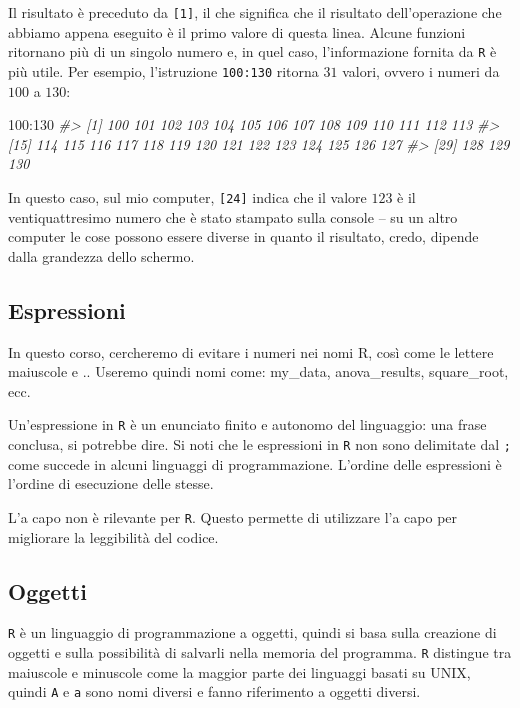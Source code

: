 \documentclass[
]{memoir}
\newenvironment{Shaded}{\begin{snugshade}}{\end{snugshade}}
\newcommand{\CommentTok}[1]{\textcolor[rgb]{0.56,0.35,0.01}{\textit{#1}}}
\newcommand{\DecValTok}[1]{\textcolor[rgb]{0.00,0.00,0.81}{#1}}
\newcommand{\SpecialCharTok}[1]{\textcolor[rgb]{0.00,0.00,0.00}{#1}}
\theoremstyle{definition}
\theoremstyle{definition}
\theoremstyle{definition}
\theoremstyle{definition}
\theoremstyle{remark}
\begin{document}
Il risultato è preceduto da \texttt{{[}1{]}}, il che significa che il risultato dell'operazione che abbiamo appena eseguito è il primo valore di questa linea. Alcune funzioni ritornano più di un singolo numero e, in quel caso, l'informazione fornita da \texttt{R} è più utile. Per esempio, l'istruzione \texttt{100:130} ritorna \(31\) valori, ovvero i numeri da \(100\) a \(130\):

\begin{Shaded}
\begin{Highlighting}[]
\DecValTok{100}\SpecialCharTok{:}\DecValTok{130}
\CommentTok{\#\textgreater{}  [1] 100 101 102 103 104 105 106 107 108 109 110 111 112 113}
\CommentTok{\#\textgreater{} [15] 114 115 116 117 118 119 120 121 122 123 124 125 126 127}
\CommentTok{\#\textgreater{} [29] 128 129 130}
\end{Highlighting}
\end{Shaded}

In questo caso, sul mio computer, \texttt{{[}24{]}} indica che il valore \(123\) è il ventiquattresimo numero che è stato stampato sulla console -- su un altro computer le cose possono essere diverse in quanto il risultato, credo, dipende dalla grandezza dello schermo.

\hypertarget{espressioni}{%
\subsection{Espressioni}\label{espressioni}}

In questo corso, cercheremo di evitare i numeri nei nomi R, così come le lettere maiuscole e .. Useremo quindi nomi come: my\_data, anova\_results, square\_root, ecc.

Un'espressione in \texttt{R} è un enunciato finito e autonomo del linguaggio: una frase conclusa, si potrebbe dire. Si noti che le espressioni in \texttt{R} non sono delimitate dal \texttt{;} come succede in alcuni linguaggi di programmazione. L'ordine delle espressioni è l'ordine di esecuzione delle stesse.

L'a capo non è rilevante per \texttt{R}. Questo permette di utilizzare l'a capo per migliorare la leggibilità del codice.

\hypertarget{oggetti}{%
\subsection{Oggetti}\label{oggetti}}

\texttt{R} è un linguaggio di programmazione a oggetti, quindi si basa sulla creazione di oggetti e sulla possibilità di salvarli nella memoria del programma. \texttt{R} distingue tra maiuscole e minuscole come la maggior parte dei linguaggi basati su UNIX, quindi \texttt{A} e \texttt{a} sono nomi diversi e fanno riferimento a oggetti diversi.
\end{document}
